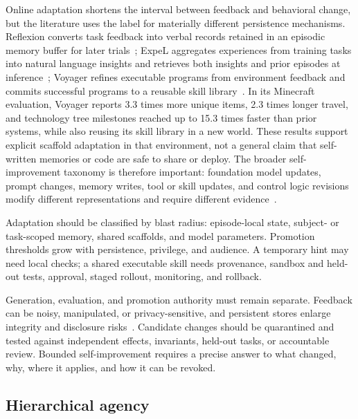 Online adaptation shortens the interval between feedback and behavioral change, but the literature uses the label for materially different persistence mechanisms. Reflexion converts task feedback into verbal records retained in an episodic memory buffer for later trials~\cite{shinn2023reflexion}; ExpeL aggregates experiences from training tasks into natural language insights and retrieves both insights and prior episodes at inference~\cite{zhao2024expel}; Voyager refines executable programs from environment feedback and commits successful programs to a reusable skill library~\cite{wang2023voyager}. In its Minecraft evaluation, Voyager reports 3.3 times more unique items, 2.3 times longer travel, and technology tree milestones reached up to 15.3 times faster than prior systems, while also reusing its skill library in a new world. These results support explicit scaffold adaptation in that environment, not a general claim that self-written memories or code are safe to share or deploy. The broader self-improvement taxonomy is therefore important: foundation model updates, prompt changes, memory writes, tool or skill updates, and control logic revisions modify different representations and require different evidence~\cite{ren2026selfimprovingagents}.

Adaptation should be classified by blast radius: episode-local state, subject- or task-scoped memory, shared scaffolds, and model parameters. Promotion thresholds grow with persistence, privilege, and audience. A temporary hint may need local checks; a shared executable skill needs provenance, sandbox and held-out tests, approval, staged rollout, monitoring, and rollback.

Generation, evaluation, and promotion authority must remain separate. Feedback can be noisy, manipulated, or privacy-sensitive, and persistent stores enlarge integrity and disclosure risks~\cite{dash2026memorypoisoning,wang2025memoryprivacy}. Candidate changes should be quarantined and tested against independent effects, invariants, held-out tasks, or accountable review. Bounded self-improvement requires a precise answer to what changed, why, where it applies, and how it can be revoked.

\subsection{Hierarchical agency}
\label{sec:hierarchy}

